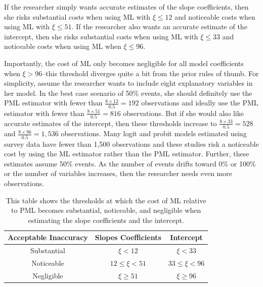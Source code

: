 \documentclass[12pt]{article}
\begin{document}
If the researcher simply wants accurate estimates of the slope coefficients, then she risks substantial costs when using ML with $\xi \leq 12$ and noticeable costs when using ML with $\xi \leq 51$. If the researcher also wants an accurate estimate of the intercept, then she risks substantial costs when using ML with $\xi \leq 33$ and noticeable costs when using ML when $\xi \leq 96$. 

Importantly, the cost of ML only becomes negligible for all model coefficients when $\xi > 96$--this threshold diverges quite a bit from the prior rules of thumb.
For simplicity, assume the researcher wants to include eight explanatory variables in her model.
In the best case scenario of 50\% events, she should definitely use the PML estimator with fewer than $\frac{8 \times 12}{0.5} = 192$ observations and ideally use the PML estimator with fewer than $\frac{8 \times 51}{0.5} = 816$ observations.  
But if she would also like accurate estimates of the intercept, then these thresholds increase to $\frac{8 \times 33}{0.5} = 528$ and $\frac{8 \times 96}{0.5} = 1,536$ observations. 
Many logit and probit models estimated using survey data have fewer than 1,500 observations and these studies risk a noticeable cost by using the ML estimator rather than the PML estimator.
Further, these estimates assume 50\% events. 
As the number of events drifts toward 0\% or 100\% or the number of variables increases, then the researcher needs even more observations.

\begin{table}[h]
\centering
\begin{tabular}{ccc}
\hline
Acceptable Inaccuracy   &  Slopes Coefficients     & Intercept        \\ \hline
Substantial & $\xi < 12$         & $\xi < 33$          \\
Noticeable  & $12 \leq \xi < 51$ & $33 \leq \xi < 96$ \\
Negligible  & $\xi \geq 51$        & $\xi \geq 96$        
\end{tabular}
\caption{This table shows the thresholds at which the cost of ML relative to PML becomes substantial, noticeable, and negligible when estimating the slope coefficients and the intercept.}\label{tbl:thresholds}
\end{table}
\end{document}
